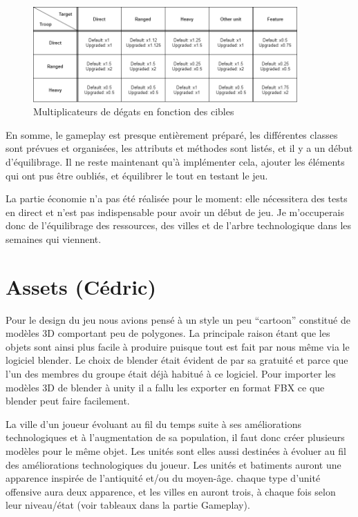 \documentclass[12pt]{report}
\begin{document}
\begin{figure}[H]
    \centering
    \includegraphics[width=0.9\textwidth]{DIAG_TROOPS__damage_multipliers}
    \caption{Multiplicateurs de dégats en fonction des cibles}
\end{figure}

En somme, le gameplay est presque entièrement préparé, les différentes classes sont prévues et organisées, les attributs et méthodes sont listés, et il y a un début d’équilibrage. Il ne reste maintenant qu’à implémenter cela, ajouter les éléments qui ont pus être oubliés, et équilibrer le tout en testant le jeu.

La partie économie n'a pas été réalisée pour le moment: elle nécessitera des tests en direct et n'est pas  indispensable pour avoir un début de jeu. Je m'occuperais donc de l'équilibrage des ressources, des villes et de l'arbre technologique dans les semaines qui viennent.

\section{Assets (Cédric)}

Pour le design du jeu nous avions pensé à un style un peu “cartoon” constitué de modèles 3D comportant peu de polygones. La principale raison étant que les objets sont ainsi plus facile à produire puisque tout est fait par nous même via le logiciel blender. Le choix de blender était évident de par sa gratuité et parce que l’un des membres du groupe était déjà habitué à ce logiciel. Pour importer les modèles 3D de blender à unity il a fallu les exporter en format FBX ce que blender peut faire facilement.

La ville d’un joueur évoluant au fil du temps suite à ses améliorations technologiques et à l’augmentation de sa population, il faut donc créer plusieurs modèles pour le même objet. Les unités sont elles aussi destinées à évoluer au fil des améliorations technologiques du joueur. Les unités et batiments auront une apparence inspirée de l'antiquité et/ou du moyen-âge. chaque type d'unité offensive aura deux apparence, et les villes en auront trois, à chaque fois selon leur niveau/état (voir tableaux dans la partie Gameplay).
\end{document}
